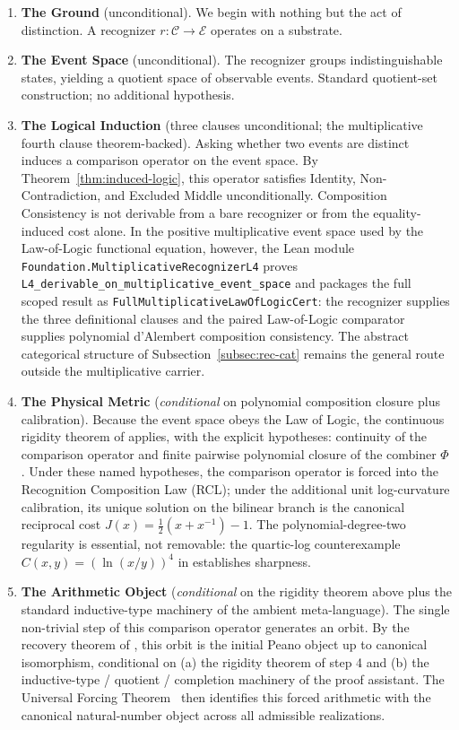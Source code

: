 \documentclass[11pt,a4paper]{article}
\theoremstyle{definition}
\theoremstyle{remark}
\begin{document}
\begin{enumerate}
\item \textbf{The Ground} (unconditional). We begin with nothing but
the act of distinction. A recognizer $r : \mathcal{C} \to \mathcal{E}$
operates on a substrate.

\item \textbf{The Event Space} (unconditional). The recognizer
groups indistinguishable states, yielding a quotient space of
observable events. Standard quotient-set construction; no additional
hypothesis.

\item \textbf{The Logical Induction} (three clauses unconditional;
the multiplicative fourth clause theorem-backed). Asking whether two
events are distinct induces a comparison operator on the event space.
By Theorem~\ref{thm:induced-logic}, this operator satisfies Identity,
Non-Contradiction, and Excluded Middle unconditionally. Composition
Consistency is not derivable from a bare recognizer or from the
equality-induced cost alone. In the positive multiplicative event
space used by the Law-of-Logic functional equation, however, the Lean
module \texttt{Foundation.MultiplicativeRecognizerL4} proves
\texttt{L4\_derivable\_on\_multiplicative\_event\_space} and packages
the full scoped result as
\texttt{FullMultiplicativeLawOfLogicCert}: the recognizer supplies
the three definitional clauses and the paired Law-of-Logic comparator
supplies polynomial d'Alembert composition consistency. The abstract
categorical structure of Subsection~\ref{subsec:rec-cat} remains the
general route outside the multiplicative carrier.

\item \textbf{The Physical Metric} (\emph{conditional} on polynomial
composition closure plus calibration). Because the event space obeys
the Law of Logic, the continuous rigidity theorem of
\cite{Washburn2026LogicFE} applies, with the explicit hypotheses:
continuity of the comparison operator and finite pairwise polynomial
closure of the combiner $\Phi$. Under these named hypotheses, the
comparison operator is forced into the Recognition Composition Law
(RCL); under the additional unit log-curvature calibration, its
unique solution on the bilinear branch is the canonical reciprocal
cost $J(x) = \tfrac{1}{2}(x + x^{-1}) - 1$. The polynomial-degree-two
regularity is essential, not removable: the quartic-log
counterexample $C(x, y) = (\ln(x/y))^4$ in
\cite{Washburn2026LogicFE} establishes sharpness.

\item \textbf{The Arithmetic Object} (\emph{conditional} on the
rigidity theorem above plus the standard inductive-type machinery
of the ambient meta-language). The single non-trivial step of this
comparison operator generates an orbit. By the recovery theorem of
\cite{Washburn2026Arithmetic}, this orbit is the initial Peano
object up to canonical isomorphism, conditional on (a) the rigidity
theorem of step 4 and (b) the inductive-type / quotient / completion
machinery of the proof assistant. The Universal Forcing
Theorem~\cite{Washburn2026UniversalForcing} then identifies this
forced arithmetic with the canonical natural-number object across
all admissible realizations.


\end{enumerate}
\end{document}

